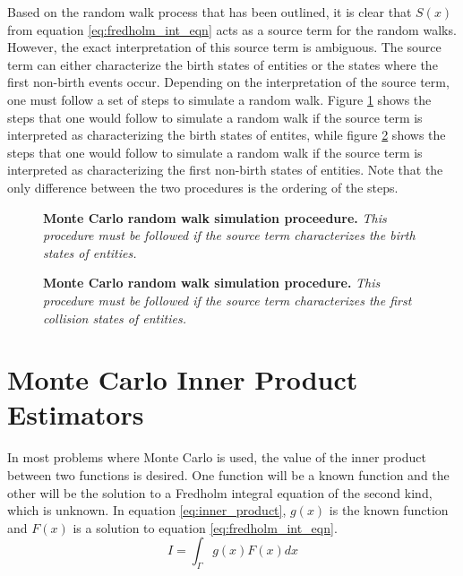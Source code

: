Based on the random walk process that has been outlined, it is clear that 
$S(x)$ from equation \ref{eq:fredholm_int_eqn} acts as a source term for
the random walks. However, the exact interpretation of this source term is 
ambiguous. The source term can either characterize the birth states of entities
or the states where the first non-birth events occur. Depending on the 
interpretation of the source term, one must follow a set of steps to simulate a
random walk. Figure \ref{fig:random_walk_process_1} shows the steps that one 
would follow to simulate a random walk if the source term is interpreted as 
characterizing the birth states of entites, while figure 
\ref{fig:random_walk_process_2} shows the steps that one would follow to 
simulate a random walk if the source term is interpreted as characterizing the 
first non-birth states of entities. Note that the only difference between the 
two procedures is the ordering of the steps.
\begin{figure}[t!]
  \begin{center}
  \end{center}
  \caption{\textbf{Monte Carlo random walk simulation proceedure.} \textit{This
      procedure must be followed if the source term characterizes the birth
      states of entities.} }
  \label{fig:random_walk_process_1}
\end{figure}
\begin{figure}[t!]
  \begin{center}
  \end{center}
  \caption{\textbf{Monte Carlo random walk simulation procedure.} \textit{This
      procedure must be followed if the source term characterizes the first
      collision states of entities.} }
  \label{fig:random_walk_process_2}
\end{figure}

\section{Monte Carlo Inner Product Estimators}
\label{sec:mc_int_eqn_estimators}
In most problems where Monte Carlo is used, the value of the inner product
between two functions is desired. One function will be a known function and
the other will be the solution to a Fredholm integral equation of the second
kind, which is unknown. In equation \ref{eq:inner_product}, $g(x)$ is the known
function and $F(x)$ is a solution to equation \ref{eq:fredholm_int_eqn}.
\begin{equation}
  I = \int_{\Gamma} g(x)F(x)dx
  \label{eq:inner_product}
\end{equation}

